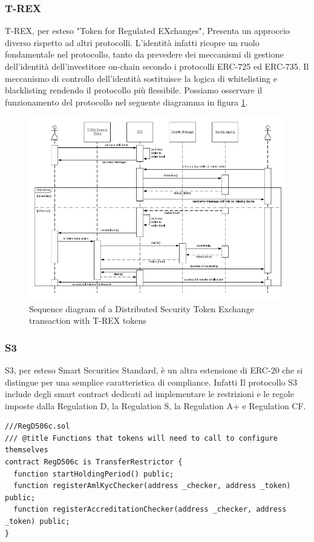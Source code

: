 \subsubsection{T-REX}
T-REX, per esteso "Token for Regulated EXchanges", Presenta un approccio diverso rispetto ad altri protocolli. L'identità infatti ricopre un ruolo fondamentale nel protocollo, tanto da prevedere dei meccanismi di gestione dell'identità dell'investitore on-chain secondo i protocolli ERC-725 ed ERC-735. Il meccanismo di controllo dell'identità sostituisce la logica di whitelisting e blacklisting rendendo il protocollo più flessibile. Possiamo osservare il funzionamento del protocollo nel seguente diagramma in figura \ref{fig:trex}.
\begin{figure}[H]
  \includegraphics[width=\linewidth]{trex.png}
  \caption{Sequence diagram of a Distributed Security Token Exchange  transaction with T-REX tokens}
  \label{fig:trex}
\end{figure}
\subsubsection{S3}
S3, per esteso Smart Securities Standard, è un altra estensione di ERC-20 che si distingue per una semplice caratteristica di compliance. Infatti Il protocollo S3 include degli smart contract dedicati ad implementare le restrizioni e le regole imposte dalla Regulation D, la Regulation S, la Regulation A+ e Regulation CF.

\begin{lstlisting}[language=Solidity,numbers=none]
///RegD506c.sol
/// @title Functions that tokens will need to call to configure themselves 
contract RegD506c is TransferRestrictor {
  function startHoldingPeriod() public;
  function registerAmlKycChecker(address _checker, address _token) public;
  function registerAccreditationChecker(address _checker, address _token) public;
}
\end{lstlisting}

